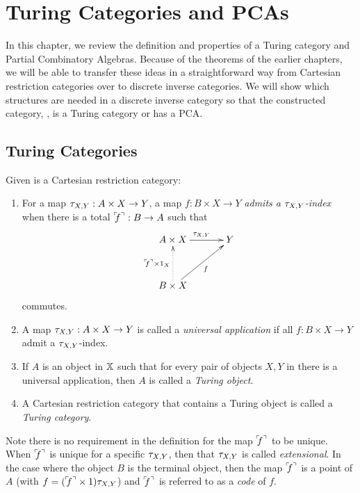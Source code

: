 \chapter{Turing Categories and PCAs} %
\label{chap:turing_categories}

In this chapter, we review the definition and properties of a Turing
category and Partial Combinatory
Algebras\cite{cockett-hostra08-intro-to-turing,cockett2010:categories-and-computability}. Because of
the theorems of the earlier chapters, we will be able to transfer these ideas in a straightforward
way from Cartesian restriction categories over to discrete inverse categories. We will show which
structures are needed in a discrete inverse category \X so that the constructed category, \Xt, is a
Turing category or has a PCA.

\section{Turing Categories}
\label{sec:turing_category_definitions}


\begin{definition}\label{def:turing_category}
  Given \X is a Cartesian restriction category:
  \begin{enumerate}
    \item For a map $\tau_{{X},{Y}}: A \times X \to Y$, a map $f:B\times X \to Y$ \emph{admits a $\tau_{{X},{Y}}$-index}
      when there is a total ${}^\ulcorner\!\!f^\urcorner:B\to A$ such that
      \[
        \xymatrix@C+10pt@R+10pt{
          A\times X \ar[r]^{\txy} & Y \\
          B\times X \ar@{.>}[u]^{\name{f}\times 1_X} \ar[ur]_f
        }
      \]
      commutes.\label{defitem:turing_admit_txy_index}
    \item A map $\tau_{{X},{Y}}: A \times X \to Y$ is called a \emph{universal application} if all
      $f:B\times X \to Y$ admit a $\tau_{{X},{Y}}$-index.\label{defitem:turing_universal_application}
    \item If $A$ is an object in $\mathbb{X}$ such that for every pair of objects $X,Y$ in \X there is
      a universal application, then $A$ is called a \emph{Turing object}.
    \item A Cartesian restriction category that contains a Turing object is called a
      \emph{Turing category}.
  \end{enumerate}
\end{definition}

Note there is no requirement in the definition for the map ${}^\ulcorner\!\!f^\urcorner$ to be unique. When ${}^\ulcorner\!\!f^\urcorner$ is unique
for a specific $\tau_{{X},{Y}}$, then that $\tau_{{X},{Y}}$ is called \emph{extensional}. In the case where the object
$B$ is the terminal object, then the map ${}^\ulcorner\!\!f^\urcorner$ is a point of $A$ (with $f = ({}^\ulcorner\!\!f^\urcorner \times 1)\tau_{{X},{Y}}$) and
${}^\ulcorner\!\!f^\urcorner$ is referred to as a \emph{code} of $f$.

